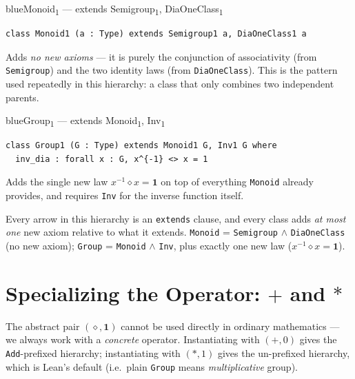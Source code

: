 \documentclass[11pt]{article}
\begin{document}
\begin{defbox}{blue}{Monoid\textsubscript{1} --- extends Semigroup\textsubscript{1}, DiaOneClass\textsubscript{1}}
\begin{lstlisting}
class Monoid1 (a : Type) extends Semigroup1 a, DiaOneClass1 a
\end{lstlisting}
Adds \emph{no new axioms} --- it is purely the conjunction of associativity (from \texttt{Semigroup}) and the two identity laws (from \texttt{DiaOneClass}). This is the pattern used repeatedly in this hierarchy: a class that only combines two independent parents.
\end{defbox}

\begin{defbox}{blue}{Group\textsubscript{1} --- extends Monoid\textsubscript{1}, Inv\textsubscript{1}}
\begin{lstlisting}
class Group1 (G : Type) extends Monoid1 G, Inv1 G where
  inv_dia : forall x : G, x^{-1} <> x = 1
\end{lstlisting}
Adds the single new law $x^{-1}\diamond x = \mathbf{1}$ on top of everything \texttt{Monoid} already provides, and requires \texttt{Inv} for the inverse function itself.
\end{defbox}

\begin{takeaway}
Every arrow in this hierarchy is an \texttt{extends} clause, and every class adds \emph{at most one} new axiom relative to what it extends. \texttt{Monoid} = \texttt{Semigroup} $\wedge$ \texttt{DiaOneClass} (no new axiom); \texttt{Group} = \texttt{Monoid} $\wedge$ \texttt{Inv}, plus exactly one new law ($x^{-1}\diamond x=\mathbf{1}$).
\end{takeaway}

\section{Specializing the Operator: \texorpdfstring{$+$}{+} and \texorpdfstring{$*$}{*}}

The abstract pair $(\diamond,\mathbf{1})$ cannot be used directly in ordinary mathematics --- we always work with a \emph{concrete} operator. Instantiating with $(+,0)$ gives the \texttt{Add}-prefixed hierarchy; instantiating with $(*,1)$ gives the un-prefixed hierarchy, which is Lean's default (i.e.\ plain \texttt{Group} means \emph{multiplicative} group).
\end{document}
